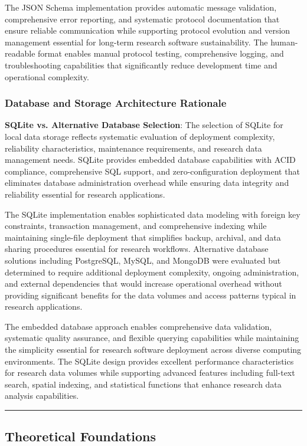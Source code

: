 \documentclass[12pt,a4paper]{report}
\begin{document}
The JSON Schema implementation provides automatic message validation, comprehensive error reporting, and systematic
protocol documentation that ensure reliable communication while supporting protocol evolution and version management
essential for long-term research software sustainability. The human-readable format enables manual protocol testing,
comprehensive logging, and troubleshooting capabilities that significantly reduce development time and operational
complexity.

\subsubsection{Database and Storage Architecture Rationale}

\textbf{SQLite vs. Alternative Database Selection}: The selection of SQLite for local data storage reflects systematic
evaluation of deployment complexity, reliability characteristics, maintenance requirements, and research data management
needs. SQLite provides embedded database capabilities with ACID compliance, comprehensive SQL support, and
zero-configuration deployment that eliminates database administration overhead while ensuring data integrity and
reliability essential for research applications.

The SQLite implementation enables sophisticated data modeling with foreign key constraints, transaction management, and
comprehensive indexing while maintaining single-file deployment that simplifies backup, archival, and data sharing
procedures essential for research workflows. Alternative database solutions including PostgreSQL, MySQL, and MongoDB
were evaluated but determined to require additional deployment complexity, ongoing administration, and external
dependencies that would increase operational overhead without providing significant benefits for the data volumes and
access patterns typical in research applications.

The embedded database approach enables comprehensive data validation, systematic quality assurance, and flexible
querying capabilities while maintaining the simplicity essential for research software deployment across diverse
computing environments. The SQLite design provides excellent performance characteristics for research data volumes while
supporting advanced features including full-text search, spatial indexing, and statistical functions that enhance
research data analysis capabilities.

\hrule

\subsection{Theoretical Foundations}
\end{document}
